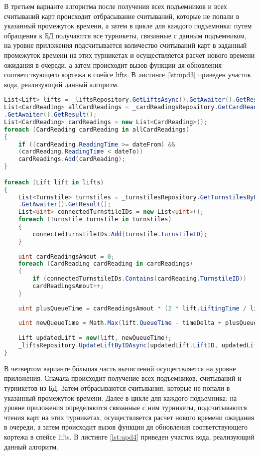 В третьем варианте алгоритма после получения всех подъемников и всех считываний карт происходит отбрасывание считываний, которые не попали в указанный промежуток времени, а затем в цикле для каждого подъемника: путем обращения к БД получаются все турникеты, связанные с данным подъемником, на уровне приложения подсчитывается количество считываний карт в заданный промежуток времени на этих турникетах и осуществляется расчет нового времени ожидания в очереди, а затем происходит вызов функции дя обновления соответствующего кортежа в спейсе lifts. В листинге \ref{lst:upd3} приведен участок кода, реализующий данный алгоритм.

\captionsetup{justification=centering,singlelinecheck=off}
\begin{lstlisting}[label=lst:upd3, caption=Третий вариант алгоритма обновления времени ожидания в очередях к подъемникам, language=csharp]
    List<Lift> lifts = _liftsRepository.GetLiftsAsync().GetAwaiter().GetResult();
List<CardReading> allCardReadings = _cardReadingsRepository.GetCardReadingsAsync()
.GetAwaiter().GetResult();
List<CardReading> cardReadings = new List<CardReading>();
foreach (CardReading cardReading in allCardReadings)
{
	if ((cardReading.ReadingTime >= dateFrom) &&
	(cardReading.ReadingTime < dateTo))
	cardReadings.Add(cardReading);
}

foreach (Lift lift in lifts)
{
	List<Turnstile> turnstiles = _turnstilesRepository.GetTurnstilesByLiftIdAsync(lift.LiftID)
	.GetAwaiter().GetResult();
	List<uint> connectedTurnstileIDs = new List<uint>();
	foreach (Turnstile turnstile in turnstiles)
	{
		connectedTurnstileIDs.Add(turnstile.TurnstileID);
	}
	
	uint cardReadingsAmout = 0;
	foreach (CardReading cardReading in cardReadings)
	{
		if (connectedTurnstileIDs.Contains(cardReading.TurnstileID))
		cardReadingsAmout++;
	}
	
	uint plusQueueTime = cardReadingsAmout * (2 * lift.LiftingTime / lift.SeatsAmount);
	
	uint newQueueTime = Math.Max(lift.QueueTime - timeDelta + plusQueueTime, 0);
	
	Lift updatedLift = new(lift, newQueueTime);
	_liftsRepository.UpdateLiftByIDAsync(updatedLift.LiftID, updatedLift.LiftName, updatedLift.IsOpen, updatedLift.SeatsAmount, updatedLift.LiftingTime).GetAwaiter().GetResult();
}
\end{lstlisting}


В четвертом варианте б\'{о}льшая часть вычислений осуществляется на уровне приложения. Сначала происходит получение всех подъемников, считываний и турникетов из БД. Затем отбрасываются считывания, которые не попали в указанный промежуток времени. Далее в цикле для каждого подъемника: на уровне приложения определяются связанные с ним турникеты, подсчитываются чтения карт на этих турникетах, осуществляется расчет нового времени ожидания в очереди, а затем происходит вызов функции дя обновления соответствующего кортежа в спейсе lifts. В листинге \ref{lst:upd4} приведен участок кода, реализующий данный алгоритм.

